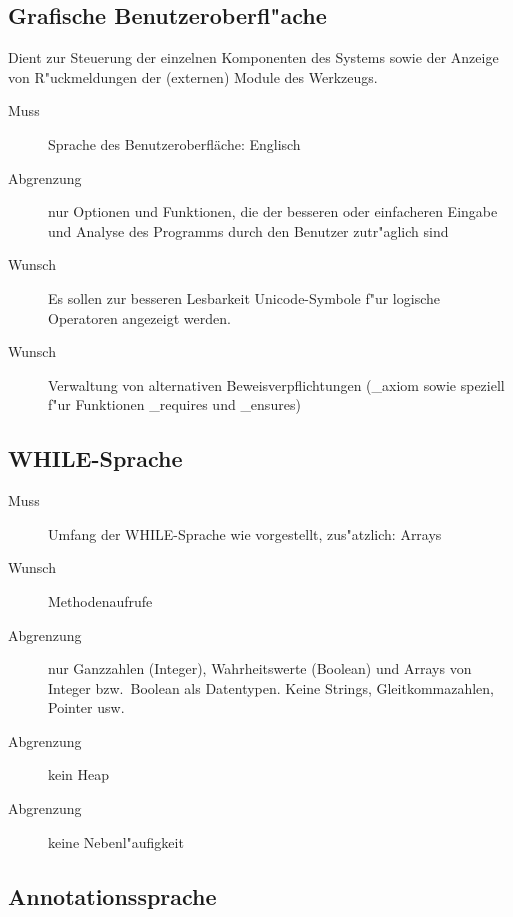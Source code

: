 \subsection{Grafische Benutzeroberfl"ache}%

Dient zur Steuerung der einzelnen Komponenten des Systems sowie der Anzeige von R"uckmeldungen der (externen) \see Module des Werkzeugs.%

\begin{description}%
    \item [Muss] Sprache des Benutzeroberfläche: Englisch%
    \item [Abgrenzung] nur Optionen und Funktionen, die der besseren oder einfacheren Eingabe und Analyse des Programms durch den Benutzer zutr"aglich sind%
    \item [Wunsch] Es sollen zur besseren Lesbarkeit \see Unicode-Symbole f"ur \see logische Operatoren angezeigt werden.%
    \item [Wunsch] Verwaltung von alternativen \see Beweisverpflichtungen (\textup{\_axiom} sowie speziell f"ur Funktionen \textup{\_requires} und \textup{\_ensures})%
\end{description}%

\subsection{\see WHILE-Sprache}%

\begin{description}%
    \item [Muss] Umfang der WHILE-Sprache wie vorgestellt, zus"atzlich: Arrays%
    \item [Wunsch] Methodenaufrufe%
    \item [Abgrenzung] nur Ganzzahlen (Integer), Wahrheitswerte (Boolean) und Arrays von Integer bzw.\ Boolean als Datentypen. Keine Strings, Gleitkommazahlen, Pointer usw.%
    \item [Abgrenzung] kein \see Heap%
    \item [Abgrenzung] keine \see Nebenl"aufigkeit%
\end{description}%

\subsection{Annotationssprache}%

